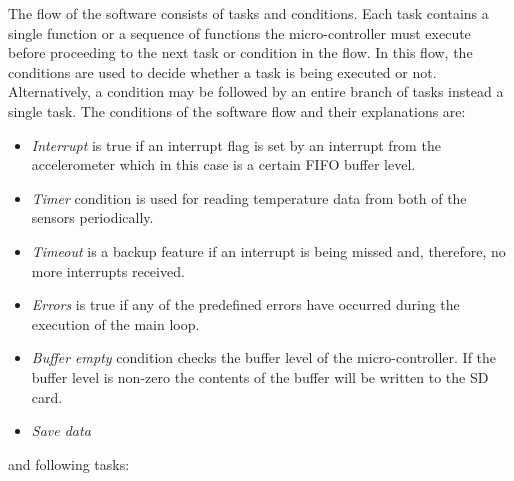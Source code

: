 \documentclass[english,12pt,a4paper,pdftex,elec,utf8]{aaltothesis}
\begin{document}
The flow of the software consists of tasks and conditions. Each task contains a single function or a sequence of functions the micro-controller must execute before proceeding to the next task or condition in the flow. In this flow, the conditions are used to decide whether a task is being executed or not. Alternatively, a condition may be followed by an entire branch of tasks instead a single task. The conditions of the software flow and their explanations are:

\begin{itemize}
\item \textit{Interrupt} is true if an interrupt flag is set by an interrupt from the accelerometer which in this case is a certain FIFO buffer level.
\item \textit{Timer} condition is used for reading temperature data from both of the sensors periodically.

\item \textit{Timeout}  is a backup feature if an interrupt is being missed and, therefore, no more interrupts received.

\item \textit{Errors}  is true if any of the predefined errors have occurred during the execution of  the main loop.

\item \textit{Buffer empty} condition checks the buffer level of the micro-controller. If the buffer level is non-zero the contents of the buffer will be written to the SD card.

\item \textit{Save data}

\end{itemize}
and following tasks:
\end{document}
